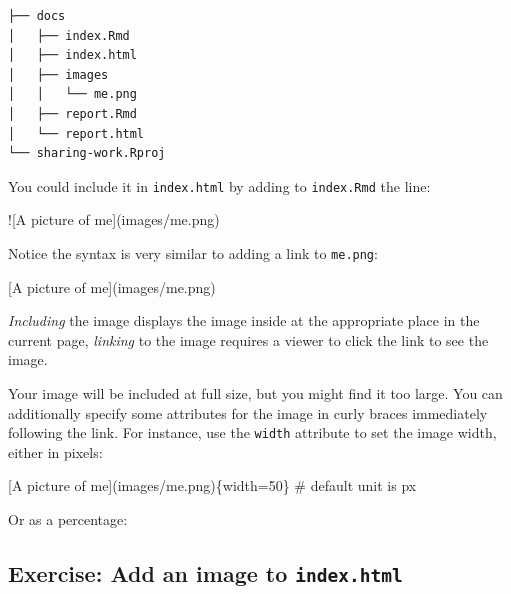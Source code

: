 \documentclass[]{Nemilov}
\newenvironment{Shaded}{\begin{snugshade}}{\end{snugshade}}
\newcommand{\AlertTok}[1]{\textcolor[rgb]{0.94,0.16,0.16}{#1}}
\newcommand{\NormalTok}[1]{#1}
\newcommand{\OtherTok}[1]{\textcolor[rgb]{0.56,0.35,0.01}{#1}}
\begin{document}
\begin{verbatim}
├── docs
│   ├── index.Rmd
│   ├── index.html
│   ├── images
│   │   └── me.png
│   ├── report.Rmd
│   └── report.html
└── sharing-work.Rproj
\end{verbatim}

You could include it in \texttt{index.html} by adding to \texttt{index.Rmd} the line:

\begin{Shaded}
\begin{Highlighting}[]
\AlertTok{![A picture of me](images/me.png)}
\end{Highlighting}
\end{Shaded}

Notice the syntax is very similar to adding a link to \texttt{me.png}:

\begin{Shaded}
\begin{Highlighting}[]
\OtherTok{[A picture of me](images/me.png)}
\end{Highlighting}
\end{Shaded}

\emph{Including} the image displays the image inside at the appropriate place in the current page, \emph{linking} to the image requires a viewer to click the link to see the image.

Your image will be included at full size, but you might find it too large. You can additionally specify some attributes for the image in curly braces immediately following the link. For instance, use the \texttt{width} attribute to set the image width, either in pixels:

\begin{Shaded}
\begin{Highlighting}[]
\OtherTok{[A picture of me](images/me.png)}\NormalTok{\{width=50\} # default unit is px}
\end{Highlighting}
\end{Shaded}

Or as a percentage:

\begin{Shaded}
\end{Shaded}

\hypertarget{exercise-add-an-image-to-index.html}{%
\subsection{\texorpdfstring{Exercise: Add an image to \texttt{index.html}}{Exercise: Add an image to index.html}}\label{exercise-add-an-image-to-index.html}}
\end{document}
